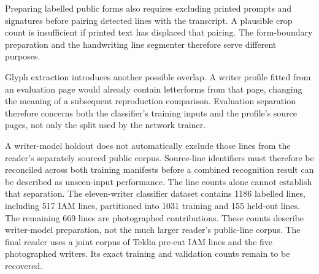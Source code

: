 Preparing labelled public forms also requires excluding printed prompts and signatures before pairing detected lines with the transcript. A plausible crop count is insufficient if printed text has displaced that pairing. The form-boundary preparation and the handwriting line segmenter therefore serve different purposes.

Glyph extraction introduces another possible overlap. A writer profile fitted from an evaluation page would already contain letterforms from that page, changing the meaning of a subsequent reproduction comparison. Evaluation separation therefore concerns both the classifier's training inputs and the profile's source pages, not only the split used by the network trainer.

A writer-model holdout does not automatically exclude those lines from the reader's separately sourced public corpus. Source-line identifiers must therefore be reconciled across both training manifests before a combined recognition result can be described as unseen-input performance. The line counts alone cannot establish that separation.
The eleven-writer classifier dataset contains 1186 labelled lines, including 517 IAM lines, partitioned into 1031 training and 155 held-out lines. The remaining 669 lines are photographed contributions. These counts describe writer-model preparation, not the much larger reader's public-line corpus. The final reader uses a joint corpus of Teklia pre-cut IAM lines and the five photographed writers. Its exact training and validation counts remain to be recovered.

